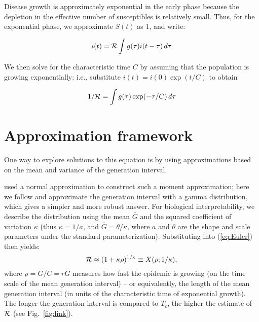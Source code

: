 \documentclass[12pt,]{article}
\newcommand{\RR}{\ensuremath{{\cal R}}}
\newcommand{\Tc}{\ensuremath{C}}
\newcommand{\eref}[1]{(\ref{eq:#1})}
\newcommand{\fref}[1]{Fig.~\ref{fig:#1}}
\begin{document}
Disease growth is approximately exponential in the early phase because the depletion in the effective number of susceptibles is relatively small.
Thus, for the exponential phase, we approximate $S(t)$ as 1, and write:

$$i(t) = \RR\int{g(\tau)i(t-\tau) \,d\tau}$$

We then solve for the characteristic time $\Tc$ by assuming that the population is growing exponentially: i.e., substitute $i(t) = i(0) \exp(t/\Tc)$ to obtain

\begin{equation}
	1/\RR = \int{g(\tau)\exp(-\tau/\Tc) \,d\tau}\label{eq:Euler}
\end{equation}

\section{Approximation framework}

One way to explore solutions to this equation is by using approximations based on the mean and variance of the generation interval.

\cite{WallLips07} used a normal approximation to construct such a moment approximation; here we follow \cite{NishCast09} and approximate the generation interval with a gamma distribution, which gives a simpler and more robust answer.
For biological interpretability, we describe the distribution using the mean $\bar G$ and the squared coefficient of variation $\kappa$ (thus $\kappa = 1/a$, and $\bar G = \theta/\kappa$, where $a$ and $\theta$ are the shape and scale parameters under the standard parameterization).
Substituting into \eref{Euler} then yields:
\begin{equation}
	\RR \approx (1 + \kappa \rho)^{1/\kappa} \equiv X(\rho; 1/\kappa),
	\label{eq:genExp}
\end{equation}
where $\rho = \bar G/\Tc = r\bar G$ measures how fast the epidemic is growing (on the time scale of the mean generation interval) -- or equivalently, the length of the mean generation interval (in units of the characteristic time of exponential growth).
The longer the generation interval is compared to $T_c$, the higher the estimate of $\RR$ (see \fref{link}).
\end{document}
